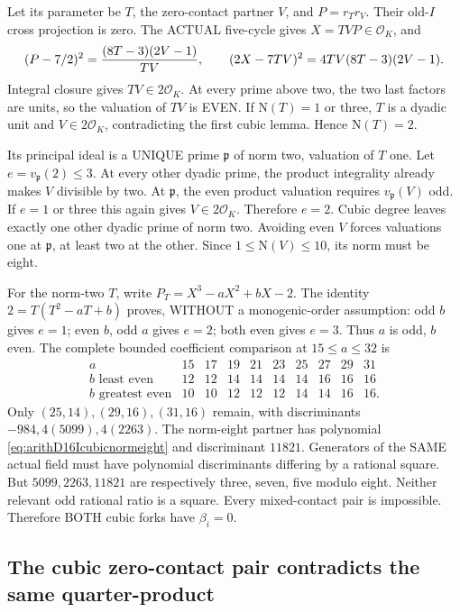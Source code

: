 Let its parameter be \(T\), the
zero-contact partner \(V\), and
\(P=r_Tr_V\).
Their old-\(I\) cross projection is
zero.
The ACTUAL five-cycle gives
\(X=TVP\in\mathcal O_K\), and
\[
 (P-7/2)^2={(8T-3)(2V-1)\over TV},\qquad
                      (2X-7TV)^2=4TV(8T-3)(2V-1).
\]
Integral closure gives \(TV\in2\mathcal O_K\).
At every prime above two, the two last
factors are units, so the valuation
of \(TV\) is EVEN.
If \(\mathrm N(T)=1\) or three,
\(T\) is a dyadic unit and
\(V\in2\mathcal O_K\), contradicting
the first cubic lemma.
Hence \(\mathrm N(T)=2\).

Its principal ideal is a UNIQUE prime
\(\mathfrak p\) of norm two, valuation
of \(T\) one.
Let \(e=v_{\mathfrak p}(2)\le3\).
At every other dyadic prime,
the product integrality already makes
\(V\) divisible by two.
At \(\mathfrak p\), the even product
valuation requires \(v_{\mathfrak p}(V)\)
odd.
If \(e=1\) or three this again gives
\(V\in2\mathcal O_K\).
Therefore \(e=2\).
Cubic degree leaves exactly one other
dyadic prime of norm two.
Avoiding even \(V\) forces valuations
one at \(\mathfrak p\), at least two
at the other.
Since \(1\le\mathrm N(V)\le10\),
its norm must be eight.

For the norm-two \(T\), write
\(P_T=X^3-aX^2+bX-2\).
The identity
\(2=T(T^2-aT+b)\) proves, WITHOUT
a monogenic-order assumption:
odd \(b\) gives \(e=1\);
even \(b\), odd \(a\) gives \(e=2\);
both even gives \(e=3\).
Thus \(a\) is odd, \(b\) even.
The complete bounded coefficient comparison
at \(15\le a\le32\) is
\[
\begin{array}{c|rrrrrrrrr}
a&15&17&19&21&23&25&27&29&31\\ \hline
b\text{ least even}&12&12&14&14&14&14&16&16&16\\
b\text{ greatest even}&10&10&12&12&12&14&14&16&16 .
\end{array}
\]
Only \((25,14),(29,16),(31,16)\)
remain, with discriminants
\(-984,4(5099),4(2263)\).
The norm-eight partner has polynomial
\eqref{eq:arithD16Icubicnormeight}
and discriminant \(11821\).
Generators of the SAME actual field
must have polynomial discriminants
differing by a rational square.
But \(5099,2263,11821\) are respectively
three, seven, five modulo eight.
Neither relevant odd rational ratio
is a square.
Every mixed-contact pair is impossible.
Therefore BOTH cubic forks have
\(\beta_i=0\).

\subsection{The cubic zero-contact pair contradicts the same quarter-product}
\label{app:arithD16Icubicfinish}

